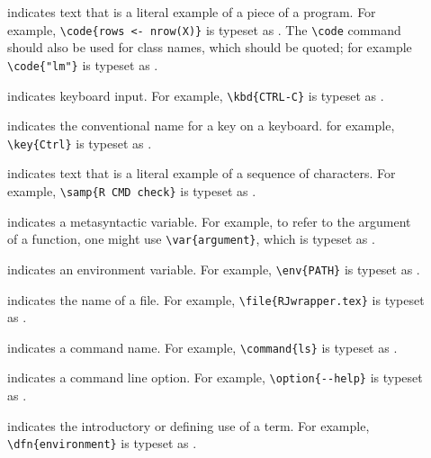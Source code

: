 \begin{description}

\item[]
indicates text that is a literal example of a piece of a program.
For example, \verb|\code{rows <- nrow(X)}| is typeset as
. The \verb|\code| command should also
be used for class names, which should be quoted; for example
\verb|\code{"lm"}| is typeset as .


\item[]
indicates keyboard input. For example,
\verb|\kbd{CTRL-C}| is typeset as .


\item[]
indicates the conventional name for a key on a keyboard.
for example, \verb|\key{Ctrl}| is typeset as .

\item[]
indicates text that is a literal example of a sequence of
characters. For example, \verb|\samp{R CMD check}| is
typeset as .

\item[]
indicates a metasyntactic variable. For example, to refer to the
argument of a function, one might use
\verb|\var{argument}|, which is typeset as .

\item[]
indicates an environment variable. For example,
\verb|\env{PATH}| is typeset as .

\item[]
indicates the name of a file. For example,
\verb|\file{RJwrapper.tex}| is typeset as .


\item[]
indicates a command name. For example,
\verb|\command{ls}| is typeset as .

\item[]
indicates a command line option. For example,
\verb|\option{--help}| is typeset as .

\item[]
indicates the introductory or defining use of a term.
For example, \verb|\dfn{environment}| is typeset as
.

\end{description}

